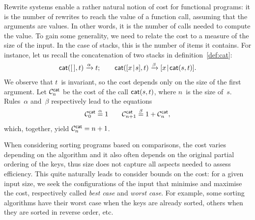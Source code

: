
Rewrite systems enable a rather natural notion of cost for functional
programs: it is the number of rewrites to reach the value of a
function call, assuming that the arguments are values. In other words,
it is the number of calls needed to compute the value. To gain some
generality, we need to relate the cost to a measure of the size of the
input. In the case of stacks, this is the number of items it
contains. For instance, let us recall the concatenation of two stacks in
definition~\eqref{def:cat}:
\begin{equation*}
\fun{cat}(        \el,t) \xrightarrow{\smash{\alpha}} t;\qquad
\fun{cat}(\cons{x}{s},t) \xrightarrow{\smash{\beta}}
\cons{x}{\fun{cat}(s,t)}.
\end{equation*}
We observe that \(t\)~is invariant, so the cost depends only on the
size of the first argument. Let
\(\C{\fun{cat}}{n}\) be the cost of the
call \(\fun{cat}(s,t)\), where \(n\)~is the
size of~\(s\). Rules~\(\alpha\) and~\(\beta\) respectively lead to the
equations
\begin{equation*}
\C{\fun{cat}}{0} \eqn{\smash{\alpha}} 1\qquad
\C{\fun{cat}}{n+1} \eqn{\smash{\beta}} 1 + \C{\fun{cat}}{n},
\end{equation*}
which, together, yield \(\C{\fun{cat}}{n} = n + 1\). \label{cost:cat}



When considering sorting programs based on comparisons, the cost
varies depending on the algorithm and it also often depends on the
original partial ordering of the keys, thus size does not capture all
aspects needed to assess efficiency. This quite naturally leads to
consider bounds on the cost: for a given input size, we seek the
configurations of the input that minimise and maximise the cost,
respectively called \emph{best case} and \emph{worst case}. For
example, some sorting algorithms have their worst case when the keys
are already sorted, others when they are sorted in reverse order, etc.


\label{par:mean_sort}

